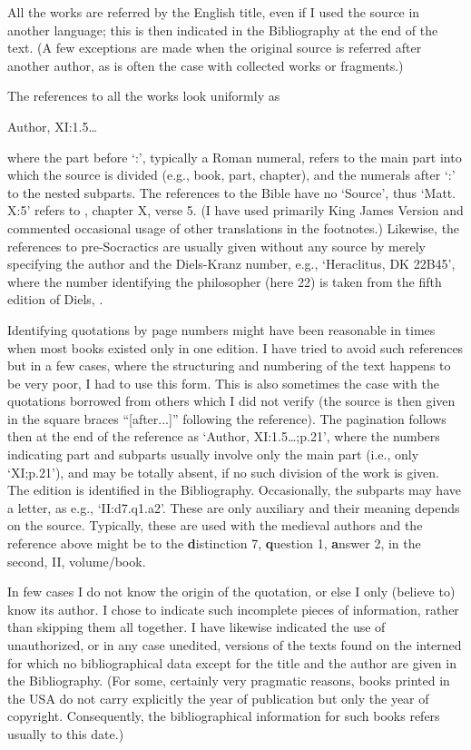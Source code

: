 
All the works are referred by the English title, even if I used the source in
another language; this is then indicated in the Bibliography at the end of the
text. (A few exceptions are made when the original source is referred after
another author, as is often the case with collected works or fragments.)

The references to all the works look uniformly as
\begin{center}
  Author,  XI:1.5\ldots
\end{center}  
where the part before `:', typically a Roman numeral, refers to the main part
into which the source is divided (e.g., book, part, chapter), and the numerals
after `:' to the nested subparts.  The references to the Bible have no `Source',
thus `Matt. X:5' refers to , chapter X, verse 5. 
(I have used primarily King James Version and commented occasional usage of
other translations in the footnotes.) 
Likewise, the references to pre-Socractics are usually given without any source by
merely specifying the author and the Diels-Kranz number, e.g., `Heraclitus, DK
22B45', where the number identifying the philosopher (here 22) is taken from the
fifth edition of Diels, .

Identifying quotations by page numbers might have been reasonable in times when
most books existed only in one edition.  I have tried to avoid such references
but in a few cases, where the structuring and numbering of the text happens to
be very poor, I had to use this form. This is also sometimes the case with the
quotations borrowed from others which I did not verify (the source is then given
in the square braces ``[after...]'' following the reference).  The pagination
follows then at the end of the reference as `Author, 
XI:1.5\ldots;p.21', where the numbers indicating part and subparts usually
involve only the main part (i.e., only `XI;p.21'), and may be totally absent, if
no such division of the work is given.  The edition is identified in the
Bibliography.  Occasionally, the subparts may have a letter, as e.g.,
`II:d7.q1.a2'. These are only auxiliary and their meaning depends on the source.
Typically, these are used with the medieval authors and the reference above
might be to the {\bf d}istinction 7, {\bf q}uestion 1, {\bf a}nswer 2, in the
second, II, volume/book.

In few cases I do not know the origin of the quotation, or else I only (believe
to) know its author. I chose to indicate such incomplete pieces of information,
rather than skipping them all together. I have likewise indicated the use of
unauthorized, or in any case unedited, versions of the texts found on the
interned for which no bibliographical data except for the title and the author
are given in the Bibliography. (For some, certainly very pragmatic reasons,
books printed in the USA do not carry explicitly the year of publication but only
the year of copyright. Consequently, the bibliographical information for such
books refers usually to this date.)

